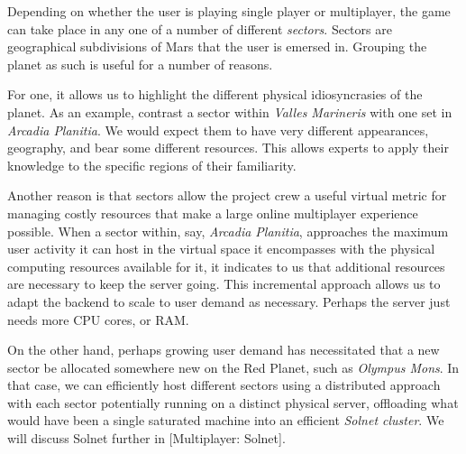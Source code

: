 

Depending on whether the user is playing single player or multiplayer, the game can take place in any one of a number of different {\it sectors}. Sectors are geographical subdivisions of Mars that the user is emersed in. Grouping the planet as such is useful for a number of reasons.

For one, it allows us to highlight the different physical idiosyncrasies of the planet. As an example, contrast a sector within {\it Valles Marineris} with one set in {\it Arcadia Planitia}. We would expect them to have very different appearances, geography, and bear some different resources. This allows experts to apply their knowledge to the specific regions of their familiarity.

Another reason is that sectors allow the project crew a useful virtual metric for managing costly resources that make a large online multiplayer experience possible. When a sector within, say, {\it Arcadia Planitia}, approaches the maximum user activity it can host in the virtual space it encompasses with the physical computing resources available for it, it indicates to us that additional resources are necessary to keep the server going. This incremental approach allows us to adapt the backend to scale to user demand as necessary. Perhaps the server just needs more CPU cores, or RAM. 

On the other hand, perhaps growing user demand has necessitated that a new sector be allocated somewhere new on the Red Planet, such as {\it Olympus Mons}. In that case, we can efficiently host different sectors using a distributed approach with each sector potentially running on a distinct physical server, offloading what would have been a single saturated machine into an efficient {\it Solnet cluster}. We will discuss Solnet further in [Multiplayer: Solnet].

